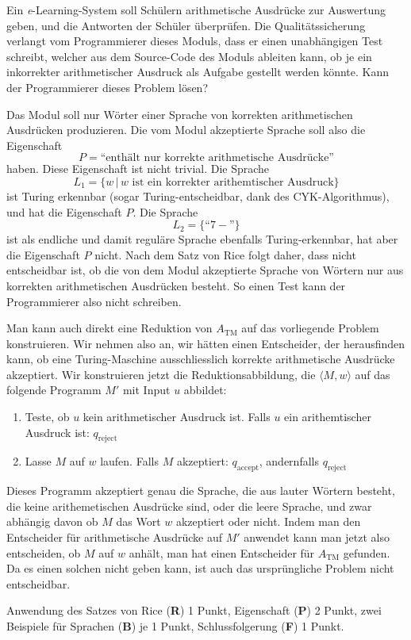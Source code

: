 Ein {\it e}-Learning-System soll Schülern arithmetische Ausdrücke
zur Auswertung geben, und die Antworten der Schüler überprüfen.
Die Qualitätssicherung verlangt vom Programmierer dieses Moduls, dass
er einen unabhängigen Test schreibt, welcher aus dem Source-Code
des Moduls ableiten kann, ob je ein inkorrekter arithmetischer Ausdruck
als Aufgabe gestellt werden könnte. Kann der Programmierer dieses
Problem lösen?


\begin{loesung}
Das Modul soll nur Wörter einer Sprache von korrekten arithmetischen
Ausdrücken produzieren.
Die vom Modul akzeptierte Sprache soll also die Eigenschaft
\[
P=\text{``enthält nur korrekte arithmetische Ausdrücke''}
\]
haben. 
Diese Eigenschaft ist nicht trivial. Die Sprache
\[
L_1=\{w\,|\,\text{$w$ ist ein korrekter arithemtischer Ausdruck}\}
\]
ist Turing erkennbar (sogar Turing-entscheidbar, dank des CYK-Algorithmus),
und hat die Eigenschaft $P$.
Die Sprache
\[
L_2=\{ \text{``$7-$''}\}
\]
ist als endliche und damit reguläre Sprache ebenfalls Turing-erkennbar,
hat aber die Eigenschaft $P$ nicht. Nach dem Satz von Rice folgt daher,
dass nicht entscheidbar ist, ob die von dem Modul akzeptierte Sprache
von Wörtern nur aus korrekten arithmetischen Ausdrücken besteht.
So einen Test kann der Programmierer also nicht schreiben.
\end{loesung}

\begin{loesung}
Man kann auch direkt eine Reduktion von $A_{\text{TM}}$ auf das vorliegende
Problem konstruieren.  Wir nehmen also an, wir hätten einen Entscheider,
der herausfinden kann, ob eine Turing-Maschine ausschliesslich korrekte
arithmetische Ausdrücke akzeptiert. Wir konstruieren jetzt die
Reduktionsabbildung, die $\langle M,w\rangle$ auf das folgende
Programm $M'$ mit Input $u$ abbildet:
\begin{enumerate}
\item Teste, ob $u$ kein arithmetischer Ausdruck ist. Falls 
$u$ ein arithemtischer Ausdruck ist: $q_\text{reject}$
\item Lasse $M$ auf $w$ laufen. Falls $M$ akzeptiert: $q_\text{accept}$,
andernfalls $q_\text{reject}$
\end{enumerate}
Dieses Programm akzeptiert genau die Sprache, die aus lauter Wörtern
besteht, die keine arithemetischen Ausdrücke sind, oder die leere
Sprache, und zwar abhängig davon ob $M$ das Wort $w$ akzeptiert
oder nicht. Indem man den Entscheider für arithmetische Ausdrücke
auf $M'$ anwendet kann man jetzt also entscheiden, ob $M$ auf $w$
anhält, man hat einen Entscheider für $A_\text{TM}$ gefunden.
Da es einen solchen nicht geben kann, ist auch das ursprüngliche
Problem nicht entscheidbar.
\end{loesung}

\begin{bewertung}
Anwendung des Satzes von Rice ({\bf R}) 1 Punkt,
Eigenschaft ({\bf P}) 2 Punkt,
zwei Beispiele für Sprachen ({\bf B}) je 1 Punkt,
Schlussfolgerung ({\bf F}) 1 Punkt.
\end{bewertung}

